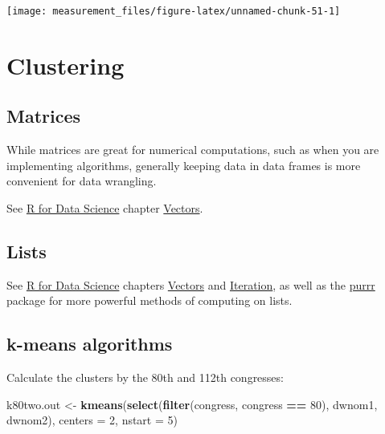 \documentclass[]{book}
\newenvironment{Shaded}{\begin{snugshade}}{\end{snugshade}}
\newcommand{\DataTypeTok}[1]{\textcolor[rgb]{0.13,0.29,0.53}{#1}}
\newcommand{\DecValTok}[1]{\textcolor[rgb]{0.00,0.00,0.81}{#1}}
\newcommand{\KeywordTok}[1]{\textcolor[rgb]{0.13,0.29,0.53}{\textbf{#1}}}
\newcommand{\NormalTok}[1]{#1}
\newcommand{\OperatorTok}[1]{\textcolor[rgb]{0.81,0.36,0.00}{\textbf{#1}}}
\newcommand{\StringTok}[1]{\textcolor[rgb]{0.31,0.60,0.02}{#1}}
\theoremstyle{definition}
\theoremstyle{definition}
\theoremstyle{definition}
\theoremstyle{remark}
\begin{document}
\begin{center}\texttt{[image: measurement\_files/figure-latex/unnamed-chunk-51-1]} \end{center}

\hypertarget{clustering}{%
\section{Clustering}\label{clustering}}

\hypertarget{matrices}{%
\subsection{Matrices}\label{matrices}}

While matrices are great for numerical computations, such as when you
are implementing algorithms, generally keeping data in data frames is
more convenient for data wrangling.

See \href{http://r4ds.had.co.nz/}{R for Data Science} chapter
\href{http://r4ds.had.co.nz/vectors.html}{Vectors}.

\hypertarget{lists}{%
\subsection{Lists}\label{lists}}

See \href{http://r4ds.had.co.nz/}{R for Data Science} chapters
\href{http://r4ds.had.co.nz/vectors.html}{Vectors} and
\href{http://r4ds.had.co.nz/iteration.html}{Iteration}, as well as the
\href{https://cran.r-project.org/package=purrr}{purrr} package for more
powerful methods of computing on lists.

\hypertarget{k-means-algorithms}{%
\subsection{k-means algorithms}\label{k-means-algorithms}}

Calculate the clusters by the 80th and 112th congresses:

\begin{Shaded}
\begin{Highlighting}[]
\NormalTok{k80two.out <-}
\StringTok{  }\KeywordTok{kmeans}\NormalTok{(}\KeywordTok{select}\NormalTok{(}\KeywordTok{filter}\NormalTok{(congress, congress }\OperatorTok{==}\StringTok{ }\DecValTok{80}\NormalTok{),}
\NormalTok{                       dwnom1, dwnom2),}
              \DataTypeTok{centers =} \DecValTok{2}\NormalTok{, }\DataTypeTok{nstart =} \DecValTok{5}\NormalTok{)}
\end{Highlighting}
\end{Shaded}
\end{document}
